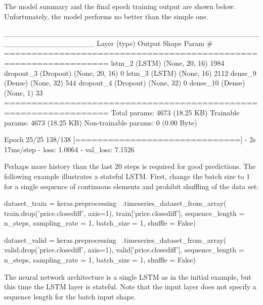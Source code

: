 \begin{withcode}
The model summary and the final epoch training output are shown below. Unfortunately, the model performs no better than the simple one.

\begin{textcode}
_________________________________________________________________
 Layer (type)                Output Shape              Param #   
=================================================================
 lstm_2 (LSTM)               (None, 20, 16)            1984      
 dropout_3 (Dropout)         (None, 20, 16)            0         
 lstm_3 (LSTM)               (None, 16)                2112      
 dense_9 (Dense)             (None, 32)                544       
 dropout_4 (Dropout)         (None, 32)                0         
 dense_10 (Dense)            (None, 1)                 33        
=================================================================
Total params: 4673 (18.25 KB)
Trainable params: 4673 (18.25 KB)
Non-trainable params: 0 (0.00 Byte)

Epoch 25/25
138/138 [==============================] - 2s 17ms/step 
- loss: 1.0064 - val_loss: 7.1526
\end{textcode}

Perhaps more history than the last 20 steps is required for good predictions. The following example illustrates a stateful LSTM. First, change the batch size to 1 for a single sequence of continuous elements and prohibit shuffling of the data set:

\begin{pythoncode}
dataset_train = keras.preprocessing \
    .timeseries_dataset_from_array(
        train.drop('price.closediff', axis=1),
        train['price.closediff'],
        sequence_length = n_steps,
        sampling_rate = 1, 
        batch_size = 1, 
        shuffle = False)
\end{pythoncode}

\begin{pythoncode}
dataset_valid = keras.preprocessing \
    .timeseries_dataset_from_array(
        valid.drop('price.closediff', axis=1),
        valid['price.closediff'],
        sequence_length = n_steps,
        sampling_rate = 1, 
        batch_size = 1, 
        shuffle = False)
\end{pythoncode}

The neural network architecture is a single LSTM as in the initial example, but this time the LSTM layer is stateful. Note that the input layer does not specify a sequence length for the batch input shape.


\end{withcode}
